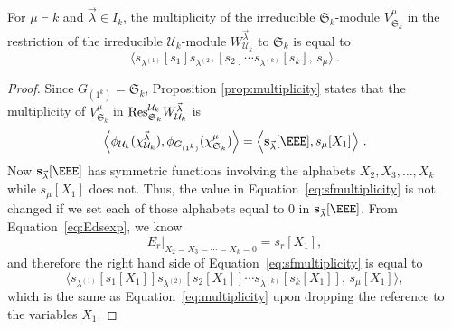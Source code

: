 \begin{cor}\label{cor:plethmult}
For $\mu \vdash k$ and $\vec{\lambda} \in I_k$,
the multiplicity of the irreducible $\mathfrak{S}_k$-module
$V^\mu_{\mathfrak{S}_k}$ in the restriction of
the irreducible $\mathcal{U}_k$-module $W^{\vec{\lambda}}_{\mathcal{U}_k}$
to $\mathfrak{S}_k$ is equal to
\begin{equation}\label{eq:multiplicity}
\big\langle s_{\lambda^{(1)}}[s_1]s_{\lambda^{(2)}}[s_2]
\cdots s_{\lambda^{(k)}}[s_k], \, s_\mu \big\rangle~.
\end{equation}
\end{cor}
\begin{proof}
Since $G_{(1^k)} = \mathfrak{S}_k$,
Proposition \ref{prop:multiplicity} states that the multiplicity of
$V^{\mu}_{\mathfrak{S}_k}$ in
${\rm Res}^{\mathcal{U}_k}_{\mathfrak{S}_k} W^{\vec{\lambda}}_{\mathcal{U}_k}$ is
\begin{equation}\label{eq:sfmultiplicity}
\Big\langle \phi_{\mathcal{U}_k}(\chi^{\vec{\lambda}}_{\mathcal{U}_k}),
\phi_{G_{(1^k)}}(\chi^{\mu}_{\mathfrak{S}_k}) \Big\rangle =
\Big\langle \mathbf{s}_{\vec{\lambda}}[\EEE], s_{\mu}[X_1] \Big\rangle~.
\end{equation}
Now $\mathbf{s}_{\vec{\lambda}}[\EEE]$ has symmetric functions involving
the alphabets $X_2, X_3, \ldots, X_k$ while $s_{\mu}[X_1]$ does
not.  Thus, the value in Equation~\eqref{eq:sfmultiplicity} is not changed if we set each of those alphabets
equal to $0$ in $\mathbf{s}_{\vec{\lambda}}[\EEE]$.
From Equation~\eqref{eq:Edsexp}, we know
\[
E_r|_{X_2=X_3= \cdots =X_k=0} = s_r[X_1],
\]
and therefore the right hand side of Equation~\eqref{eq:sfmultiplicity} is equal to
\[
\big\langle s_{\lambda^{(1)}}[s_1[X_1]]
s_{\lambda^{(2)}}[s_2[X_1]]
\cdots
s_{\lambda^{(k)}}[s_k[X_1]], \, s_{\mu}[X_1] \big\rangle,
\]
which is the same as Equation~\eqref{eq:multiplicity}
upon dropping the reference to the variables $X_1$.
\end{proof}






